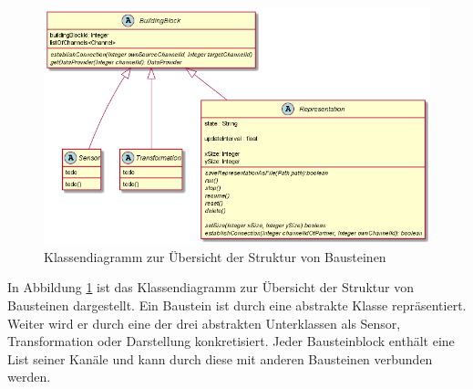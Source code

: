 \documentclass[parskip=full]{scrartcl}
\begin{document}
\begin{figure}[htbp]
	\begin{center}
		\includegraphics[width = 16cm]{Grafik/Blocks.png}
		\caption{Klassendiagramm zur Übersicht der Struktur von Bausteinen }
		\label{class-Blocks}
	\end{center}
\end{figure}
In Abbildung \ref{class-Blocks} ist das Klassendiagramm zur Übersicht der Struktur von Bausteinen dargestellt. Ein Baustein ist durch eine abstrakte Klasse repräsentiert. Weiter wird er durch eine der drei abstrakten Unterklassen als Sensor, Transformation oder Darstellung konkretisiert. Jeder Bausteinblock enthält eine List seiner Kanäle und kann durch diese mit anderen Bausteinen verbunden werden.
\end{document}
